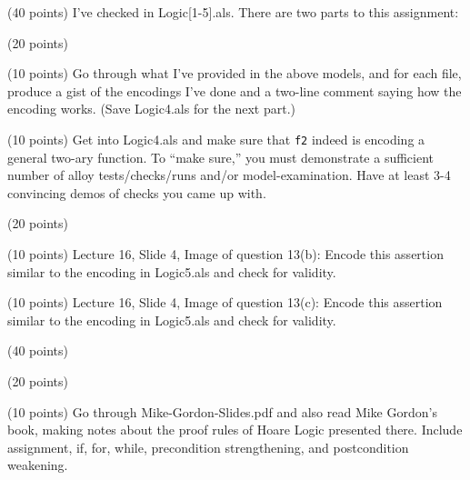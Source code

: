 \documentclass[11pt]{article}
\begin{document}
\begin{compactenum}

\item (40 points)
  I've checked in Logic[1-5].als. There are two parts to this assignment:
  \begin{compactenum}
  \item (20 points)
    \begin{compactenum}
    \item (10 points)
    Go through what I've provided in the above models, and for each
    file, produce a gist of the encodings I've done and a  two-line
    comment saying how the encoding works. (Save Logic4.als for the
    next part.)

    \item (10 points)
    Get into Logic4.als and make sure that {\tt f2} indeed
    is encoding a general two-ary function. To ``make sure,'' you must
    demonstrate a sufficient number of alloy tests/checks/runs and/or
    model-examination. Have at least 3-4 convincing demos of checks
    you came up with.
      
    \end{compactenum}
    
  \item (20 points)
    \begin{compactenum}
    \item (10 points) Lecture 16, Slide 4, Image of question 13(b):
      Encode this assertion similar to the encoding in Logic5.als
      and check for validity.
      
    \item (10 points) Lecture 16, Slide 4, Image of question 13(c):
      Encode this assertion similar to the encoding in Logic5.als
      and check for validity.      
    \end{compactenum}
  \end{compactenum}

  
\begin{minipage}{\minpagw}
\end{minipage}

\item (40 points)
  \begin{compactenum}
  \item (20 points)
    \begin{compactenum}
    \item (10 points)
      Go through Mike-Gordon-Slides.pdf and also read Mike Gordon's book,
      making notes about the proof rules of Hoare Logic presented there.
      Include assignment, if, for, while, precondition
      strengthening, and postcondition weakening.


\end{compactenum}
\end{compactenum}
\end{compactenum}
\end{document}
